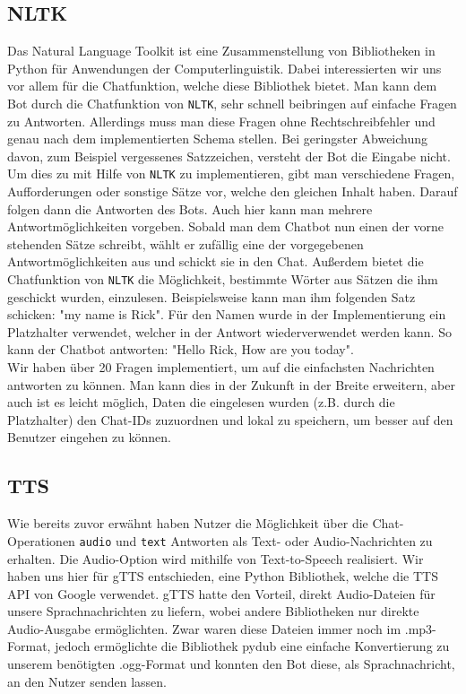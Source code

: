 \documentclass[12pt]{article}
\begin{document}
\subsection{NLTK}\label{subsec:nltk}
Das Natural Language Toolkit ist eine Zusammenstellung von Bibliotheken in Python für Anwendungen der Computerlinguistik. Dabei interessierten wir uns vor allem für die Chatfunktion, welche diese Bibliothek bietet. Man kann dem Bot durch die Chatfunktion von \texttt{NLTK}, sehr schnell beibringen auf einfache Fragen zu Antworten. Allerdings muss man diese Fragen ohne Rechtschreibfehler und genau nach dem implementierten Schema stellen. Bei geringster Abweichung davon, zum Beispiel vergessenes Satzzeichen, versteht der Bot die Eingabe nicht. \\
Um dies zu mit Hilfe von \texttt{NLTK} zu implementieren, gibt man verschiedene Fragen, Aufforderungen oder sonstige Sätze vor, welche den gleichen Inhalt haben. Darauf folgen dann die Antworten des Bots. Auch hier kann man mehrere Antwortmöglichkeiten vorgeben. Sobald man dem Chatbot nun einen der vorne stehenden Sätze schreibt, wählt er zufällig eine der vorgegebenen Antwortmöglichkeiten aus und schickt sie in den Chat. Außerdem bietet die Chatfunktion von \texttt{NLTK} die Möglichkeit, bestimmte Wörter aus Sätzen die ihm geschickt wurden, einzulesen. Beispielsweise kann man ihm folgenden Satz schicken: "my name is Rick". Für den Namen wurde in der Implementierung ein Platzhalter verwendet, welcher in der Antwort wiederverwendet werden kann. So kann der Chatbot antworten: "Hello Rick, How are you today". \\
Wir haben über 20 Fragen implementiert, um auf die einfachsten Nachrichten antworten zu können. Man kann dies in der Zukunft in der Breite erweitern, aber auch ist es leicht möglich, Daten die eingelesen wurden (z.B. durch die Platzhalter) den Chat-IDs zuzuordnen und lokal zu speichern, um besser auf den Benutzer eingehen zu können.
\subsection{TTS}\label{subsec:tts}
Wie bereits zuvor erwähnt haben Nutzer die Möglichkeit über die Chat-Operationen \texttt{\textbacklash audio} und \texttt{\textbacklash text} Antworten als Text- oder Audio-Nachrichten zu erhalten. Die Audio-Option wird mithilfe von Text-to-Speech realisiert. Wir haben uns hier für gTTS entschieden, eine Python Bibliothek, welche die TTS API von Google verwendet. gTTS hatte den Vorteil, direkt Audio-Dateien für unsere Sprachnachrichten zu liefern, wobei andere Bibliotheken nur direkte Audio-Ausgabe ermöglichten. Zwar waren diese Dateien immer noch im .mp3-Format, jedoch ermöglichte die Bibliothek pydub eine einfache Konvertierung zu unserem benötigten .ogg-Format und konnten den Bot diese, als Sprachnachricht, an den Nutzer senden lassen.
\end{document}
